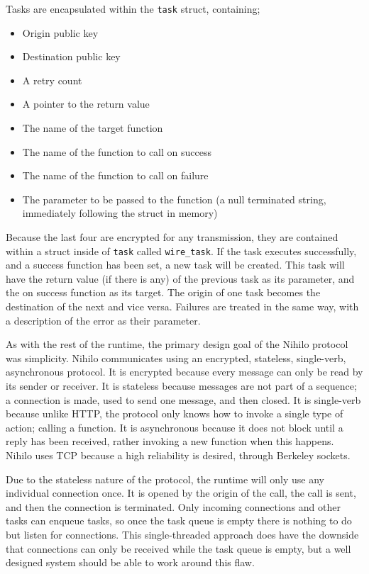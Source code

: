 \documentclass{article}
\begin{document}
Tasks are encapsulated within the \texttt{task} struct, containing;
\begin{itemize}
\item Origin public key
\item Destination public key
\item A retry count
\item A pointer to the return value
\item The name of the target function
\item The name of the function to call on success
\item The name of the function to call on failure
\item The parameter to be passed to the function (a null terminated string, immediately following the struct in memory)
\end{itemize}

Because the last four are encrypted for any transmission, they are contained within a struct inside of \texttt{task} called \texttt{wire\_task}. If the task executes successfully, and a success function has been set, a new task will be created. This task will have the return value (if there is any) of the previous task as its parameter, and the on success function as its target. The origin of one task becomes the destination of the next and vice versa.  Failures are treated in the same way, with a description of the error as their parameter.

As with the rest of the runtime, the primary design goal of the Nihilo protocol was simplicity. Nihilo communicates using an encrypted, stateless, single-verb, asynchronous protocol. It is encrypted because every message can only be read by its sender or receiver. It is stateless because messages are not part of a sequence; a connection is made, used to send one message, and then closed. It is single-verb because unlike HTTP, the protocol only knows how to invoke a single type of action; calling a function. It is asynchronous because it does not block until a reply has been received, rather invoking a new function when this happens. Nihilo uses TCP because a high reliability is desired, through Berkeley sockets.

Due to the stateless nature of the protocol, the runtime will only use any individual connection once. It is opened by the origin of the call, the call is sent, and then the connection is terminated. Only incoming connections and other tasks can enqueue tasks, so once the task queue is empty there is nothing to do but listen for connections. This single-threaded approach does have the downside that connections can only be received while the task queue is empty, but a well designed system should be able to work around this flaw.
\end{document}
